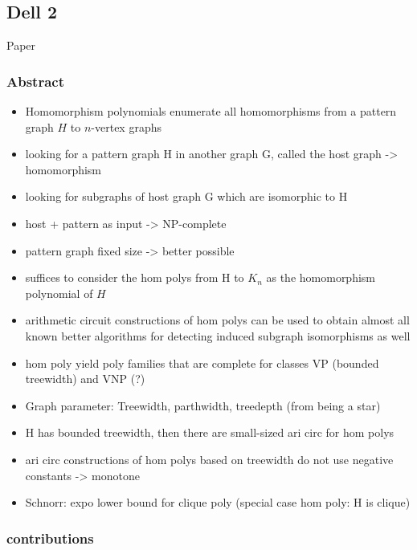 \subsection{Dell 2}

Paper \cite{dell-2} 


\subsubsection{Abstract}

\begin{itemize}
    \item Homomorphism polynomials enumerate all homomorphisms from a pattern graph $H$ to $n$-vertex graphs
    \item looking for a pattern graph H in another graph G, called the host graph -> homomorphism
    \item looking for subgraphs of host graph G which are isomorphic to H
    \item host + pattern as input -> NP-complete
    \item pattern graph fixed size -> better possible
    \item suffices to consider the hom polys from H to $K_n$ as the homomorphism polynomial of $H$
    \item arithmetic circuit constructions of hom polys can be used to obtain almost all known better algorithms for detecting induced subgraph isomorphisms as well
    \item hom poly yield poly families that are complete for classes VP (bounded treewidth) and VNP (?)
    \item Graph parameter: Treewidth, parthwidth, treedepth (from being a star)
    \item H has bounded treewidth, then there are small-sized ari circ for hom polys
    \item ari circ constructions of hom polys based on treewidth do not use negative constants -> monotone
    \item Schnorr: expo lower bound for clique poly (special case hom poly: H is clique)
\end{itemize}

\subsubsection{contributions}


